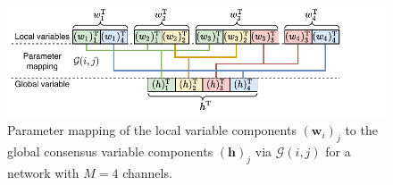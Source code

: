 \documentclass{article}
\newcommand{\hf}{{\bm{h}}}
\newcommand{\wf}{{\bm{w}}}
\begin{document}
\begin{figure}
    \centering
    \includegraphics[trim={0.3cm 0.25cm 1.7cm 0.0cm},clip,width=\columnwidth]{images/parameter_mapping2.pdf}
    \vspace*{-0.5cm}
    \caption{Parameter mapping of the local variable components \(({\wf}_i)_j\) to the global consensus variable components \(({\hf})_j\) via \(\mathcal{G}(i,j)\) for a network with \(M=4\) channels.}
    \label{fig:problem_splitting:parameter_mapping}
\end{figure}
\end{document}
